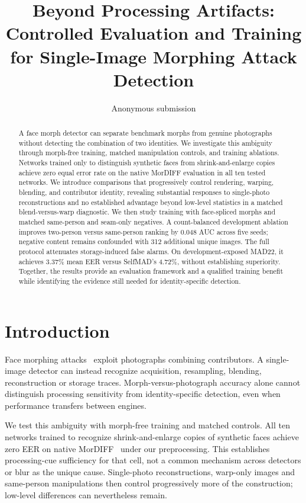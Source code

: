 \documentclass[10pt,twocolumn,letterpaper]{article}
\title{Beyond Processing Artifacts: Controlled Evaluation and Training\\for Single-Image Morphing Attack Detection}
\author{Anonymous submission}
\begin{document}
\maketitle
\begin{abstract}
A face morph detector can separate benchmark morphs from genuine photographs without detecting the combination of two identities. We investigate this ambiguity through morph-free training, matched manipulation controls, and training ablations. Networks trained only to distinguish synthetic faces from shrink-and-enlarge copies achieve zero equal error rate on the native MorDIFF evaluation in all ten tested networks. We introduce comparisons that progressively control rendering, warping, blending, and contributor identity, revealing substantial responses to single-photo reconstructions and no established advantage beyond low-level statistics in a matched blend-versus-warp diagnostic. We then study training with face-spliced morphs and matched same-person and seam-only negatives. A count-balanced development ablation improves two-person versus same-person ranking by 0.048 AUC across five seeds; negative content remains confounded with 312 additional unique images. The full protocol attenuates storage-induced false alarms. On development-exposed MAD22, it achieves 3.37\% mean EER versus SelfMAD's 4.72\%, without establishing superiority. Together, the results provide an evaluation framework and a qualified training benefit while identifying the evidence still needed for identity-specific detection.
\end{abstract}

\section{Introduction}
Face morphing attacks~\cite{ferrara2014magic} exploit photographs combining contributors. A single-image detector can instead recognize acquisition, resampling, blending, reconstruction or storage traces. Morph-versus-photograph accuracy alone cannot distinguish processing sensitivity from identity-specific detection, even when performance transfers between engines.

We test this ambiguity with morph-free training and matched controls. All ten networks trained to recognize shrink-and-enlarge copies of synthetic faces achieve zero EER on native MorDIFF~\cite{damer2023mordiff} under our preprocessing. This establishes processing-cue sufficiency for that cell, not a common mechanism across detectors or blur as the unique cause. Single-photo reconstructions, warp-only images and same-person manipulations then control progressively more of the construction; low-level differences can nevertheless remain.
\end{document}
